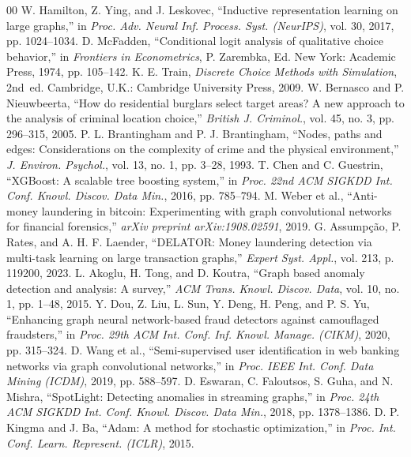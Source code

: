 \documentclass[conference]{IEEEtran}
\begin{document}
\begin{thebibliography}{00}
 W. Hamilton, Z. Ying, and J. Leskovec, ``Inductive representation learning on large graphs,'' in \textit{Proc. Adv. Neural Inf. Process. Syst. (NeurIPS)}, vol. 30, 2017, pp. 1024--1034.
 D. McFadden, ``Conditional logit analysis of qualitative choice behavior,'' in \textit{Frontiers in Econometrics}, P. Zarembka, Ed. New York: Academic Press, 1974, pp. 105--142.
 K. E. Train, \textit{Discrete Choice Methods with Simulation}, 2nd~ed. Cambridge, U.K.: Cambridge University Press, 2009.
 W. Bernasco and P. Nieuwbeerta, ``How do residential burglars select target areas? A new approach to the analysis of criminal location choice,'' \textit{British J. Criminol.}, vol. 45, no. 3, pp. 296--315, 2005.
 P. L. Brantingham and P. J. Brantingham, ``Nodes, paths and edges: Considerations on the complexity of crime and the physical environment,'' \textit{J. Environ. Psychol.}, vol. 13, no. 1, pp. 3--28, 1993.
 T. Chen and C. Guestrin, ``XGBoost: A scalable tree boosting system,'' in \textit{Proc. 22nd ACM SIGKDD Int. Conf. Knowl. Discov. Data Min.}, 2016, pp. 785--794.
 M. Weber et al., ``Anti-money laundering in bitcoin: Experimenting with graph convolutional networks for financial forensics,'' \textit{arXiv preprint arXiv:1908.02591}, 2019.
 G. Assumpção, P. Rates, and A. H. F. Laender, ``DELATOR: Money laundering detection via multi-task learning on large transaction graphs,'' \textit{Expert Syst. Appl.}, vol. 213, p. 119200, 2023.
 L. Akoglu, H. Tong, and D. Koutra, ``Graph based anomaly detection and analysis: A survey,'' \textit{ACM Trans. Knowl. Discov. Data}, vol. 10, no. 1, pp. 1--48, 2015.
 Y. Dou, Z. Liu, L. Sun, Y. Deng, H. Peng, and P. S. Yu, ``Enhancing graph neural network-based fraud detectors against camouflaged fraudsters,'' in \textit{Proc. 29th ACM Int. Conf. Inf. Knowl. Manage. (CIKM)}, 2020, pp. 315--324.
 D. Wang et al., ``Semi-supervised user identification in web banking networks via graph convolutional networks,'' in \textit{Proc. IEEE Int. Conf. Data Mining (ICDM)}, 2019, pp. 588--597.
 D. Eswaran, C. Faloutsos, S. Guha, and N. Mishra, ``SpotLight: Detecting anomalies in streaming graphs,'' in \textit{Proc. 24th ACM SIGKDD Int. Conf. Knowl. Discov. Data Min.}, 2018, pp. 1378--1386.
 D. P. Kingma and J. Ba, ``Adam: A method for stochastic optimization,'' in \textit{Proc. Int. Conf. Learn. Represent. (ICLR)}, 2015.

\end{thebibliography}
\end{document}
